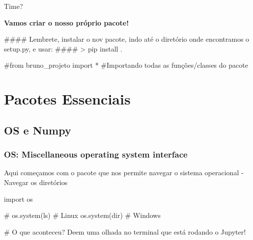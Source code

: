 \documentclass[
  letterpaper,
  DIV=11,
  numbers=noendperiod]{scrreprt}
\newenvironment{Shaded}{\begin{snugshade}}{\end{snugshade}}
\newcommand{\CommentTok}[1]{\textcolor[rgb]{0.37,0.37,0.37}{#1}}
\newcommand{\NormalTok}[1]{\textcolor[rgb]{0.00,0.23,0.31}{#1}}
\begin{document}
\begin{Shaded}
\begin{Highlighting}[]
\NormalTok{Time?}
\end{Highlighting}
\end{Shaded}

\textbf{Vamos criar o nosso próprio pacote!}

\begin{Shaded}
\begin{Highlighting}[]
\CommentTok{\#\#\#\# Lembrete, instalar o nov pacote, indo até o diretório onde encontramos o setup.py, e usar:}
\CommentTok{\#\#\#\# \textgreater{} pip install .}

\CommentTok{\#from bruno\_projeto import * \#Importando todas as funções/classes do pacote}
\end{Highlighting}
\end{Shaded}

\part{Pacotes Essenciais}

\chapter{OS e Numpy}\label{os-e-numpy}

\section{OS: Miscellaneous operating system
interface}\label{os-miscellaneous-operating-system-interface}

Aqui começamos com o pacote que nos permite navegar o sistema
operacional - Navegar os diretórios

\begin{Shaded}
\begin{Highlighting}[]
\NormalTok{import os}
\end{Highlighting}
\end{Shaded}

\begin{Shaded}
\begin{Highlighting}[]
\NormalTok{\# os.system(\textquotesingle{}ls\textquotesingle{}) \# Linux}
\NormalTok{os.system(\textquotesingle{}dir\textquotesingle{}) \# Windows }

\NormalTok{\# O que aconteceu? Deem uma olhada no terminal que está rodando o Jupyter!}
\end{Highlighting}
\end{Shaded}
\end{document}
